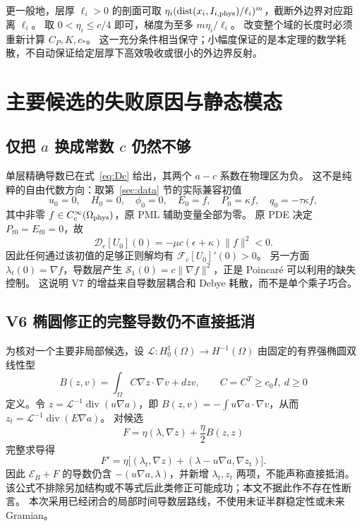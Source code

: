 \documentclass[UTF8,a4paper,11pt,fontset=none]{ctexart}
\numberwithin{equation}{section}
\theoremstyle{definition}
\theoremstyle{definition}
\newcommand{\Om}{\Omega}
\newcommand{\eps}{\epsilon}
\newcommand{\Ecal}{\mathcal E}
\newcommand{\Fc}{\mathcal F_c}
\newcommand{\Dc}{\mathcal D_c}
\newcommand{\Sc}{\mathscr S}
\DeclareMathOperator{\diver}{div}
\begin{document}
更一般地，层厚 $\ell_i>0$ 的剖面可取
$\eta_i(\operatorname{dist}(x_i,I_{i,\rm phys})/\ell_i)^m$，截断外边界对应距离 $\ell_i$。
取 $0<\eta_i\le c/4$ 即可，梯度为至多 $m\eta_i/\ell_i$。
改变整个域的长度时必须重新计算 $C_P,K,c_*$。
这一充分条件相当保守；小幅度保证的是本定理的数学耗散，不自动保证给定层厚下高效吸收或很小的外边界反射。

\section{主要候选的失败原因与静态模态}
\label{sec:failures}

\subsection{仅把 $a$ 换成常数 $c$ 仍然不够}
单层精确导数已在式~\eqref{eq:Dc} 给出，其两个 $a-c$ 系数在物理区为负。
这不是纯粹的自由代数方向：取第~\ref{sec:data} 节的实际兼容初值
\[
 u_0=0,\quad H_0=0,\quad\phi_0=0,\quad E_0=f,\quad P_0=\kappa f,
 \quad q_0=-\tau\kappa f,
\]
其中非零 $f\in C_c^\infty(\Om_{\rm phys})$，原 PML 辅助变量全部为零。
原 PDE 决定 $P_{t0}=E_{t0}=0$，故
\[
 \Dc[U_0](0)=-\mu c(\eps+\kappa)\|f\|^2<0.
\]
因此任何通过该初值的足够正则解均有 $\Fc[U_0]'(0)>0$。
另一方面 $\lambda_t(0)=\nabla f$，导数层产生
$\Sc_1(0)=c\|\nabla f\|^2$，正是 Poincar\'e 可以利用的缺失控制。
这说明 V7 的增益来自导数层耦合和 Debye 耗散，而不是单个乘子巧合。

\subsection{V6 椭圆修正的完整导数仍不直接抵消}
为核对一个主要非局部候选，设 $\mathcal L:H_0^1(\Om)\to H^{-1}(\Om)$ 由固定的有界强椭圆双线性型
\[
 B(z,v)=\int_\Om C\nabla z\cdot\nabla v+d zv,
 \qquad C=C^T\ge c_0I,\ d\ge0
\]
定义。令 $z=\mathcal L^{-1}\diver(u\nabla a)$，即
$B(z,v)=-\int u\nabla a\cdot\nabla v$，从而
$z_t=\mathcal L^{-1}\diver(E\nabla a)$。
对候选
\[
 F=\eta(\lambda,\nabla z)+\frac\eta2B(z,z)
\]
完整求导得
\begin{equation}\label{eq:nonlocalfail}
 F'=\eta\big[(\lambda_t,\nabla z)+(\lambda-u\nabla a,\nabla z_t)\big].
\end{equation}
因此 $\Ecal_B+F$ 的导数仍含 $-(u\nabla a,\lambda)$，并新增 $\lambda_t,z_t$ 两项，不能声称直接抵消。
该公式不排除另加结构或不等式后此类修正可能成功；本文不据此作不存在性断言。
本次采用已经闭合的局部时间导数层路线，不使用未证半群稳定性或未来 Gramian。
\end{document}
